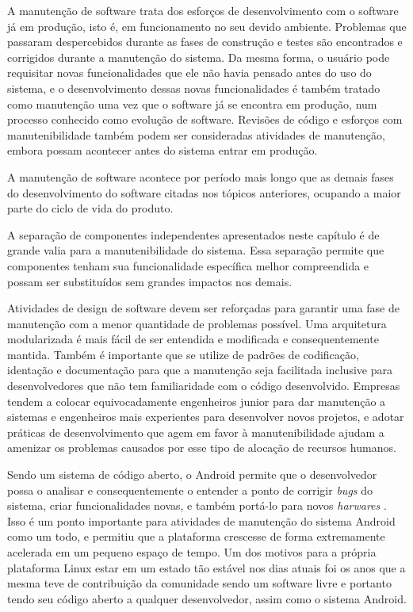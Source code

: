 A manutenção de software trata dos esforços de desenvolvimento com o software já em produção, isto é, em funcionamento no seu devido ambiente. Problemas que passaram despercebidos durante as fases de construção e testes são encontrados e corrigidos durante a manutenção do sistema. Da mesma forma, o usuário pode requisitar novas funcionalidades que ele não havia pensado antes do uso do sistema, e o desenvolvimento dessas novas funcionalidades é também tratado como manutenção uma vez que o software já se encontra em produção, num processo conhecido como evolução de software. Revisões de código e esforços com manutenibilidade também podem ser consideradas atividades de manutenção, embora possam acontecer antes do sistema entrar em produção.

A manutenção de software acontece por período mais longo que as demais fases do desenvolvimento do software citadas nos tópicos anteriores, ocupando a maior parte do ciclo de vida do produto.

A separação de componentes independentes apresentados neste capítulo é de grande valia para a manutenibilidade do sistema. Essa separação permite que componentes tenham sua funcionalidade específica melhor compreendida e possam ser substituídos sem grandes impactos nos demais. 

Atividades de design de software devem ser reforçadas para garantir uma fase de manutenção com a menor quantidade de problemas possível. Uma arquitetura modularizada é mais fácil de ser entendida e modificada e consequentemente mantida. Também é importante que se utilize de padrões de codificação, identação e documentação para que a manutenção seja facilitada inclusive para desenvolvedores que não tem familiaridade com o código desenvolvido. Empresas tendem a colocar equivocadamente engenheiros junior para dar manutenção a sistemas e engenheiros mais experientes para desenvolver novos projetos, e adotar práticas de desenvolvimento que agem em favor à manutenibilidade ajudam a amenizar os problemas causados por esse tipo de alocação de recursos humanos.

Sendo um sistema de código aberto, o Android permite que o desenvolvedor possa o analisar e consequentemente o entender a ponto de corrigir \textit{bugs} do sistema, criar funcionalidades novas, e também portá-lo para novos \textit{harwares} \cite{googleandroid}. Isso é um ponto importante para atividades de manutenção do sistema Android como um todo, e permitiu que a plataforma crescesse de forma extremamente acelerada em um pequeno espaço de tempo. Um dos motivos para a própria plataforma Linux estar em um estado tão estável nos dias atuais foi os anos que a mesma teve de contribuição da comunidade sendo um software livre e portanto tendo seu código aberto a qualquer desenvolvedor, assim como o sistema Android. 